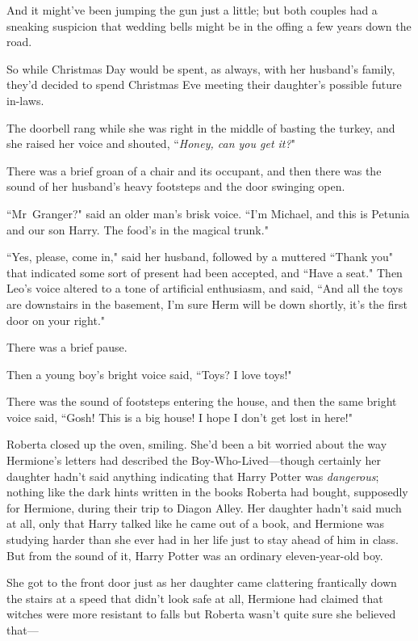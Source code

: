 And it might've been jumping the gun just a little; but both couples had a sneaking suspicion that wedding bells might be in the offing a few years down the road.

So while Christmas Day would be spent, as always, with her husband's family, they'd decided to spend Christmas Eve meeting their daughter's possible future in-laws.

The doorbell rang while she was right in the middle of basting the turkey, and she raised her voice and shouted, ``\emph{Honey, can you get it?}"

There was a brief groan of a chair and its occupant, and then there was the sound of her husband's heavy footsteps and the door swinging open.

``Mr~Granger?" said an older man's brisk voice. ``I'm Michael, and this is Petunia and our son Harry. The food's in the magical trunk."

``Yes, please, come in," said her husband, followed by a muttered ``Thank you" that indicated some sort of present had been accepted, and ``Have a seat." Then Leo's voice altered to a tone of artificial enthusiasm, and said, ``And all the toys are downstairs in the basement, I'm sure Herm will be down shortly, it's the first door on your right."

There was a brief pause.

Then a young boy's bright voice said, ``Toys? I love toys!"

There was the sound of footsteps entering the house, and then the same bright voice said, ``Gosh! This is a big house! I hope I don't get lost in here!"

Roberta closed up the oven, smiling. She'd been a bit worried about the way Hermione's letters had described the Boy-Who-Lived—though certainly her daughter hadn't said anything indicating that Harry Potter was \emph{dangerous}; nothing like the dark hints written in the books Roberta had bought, supposedly for Hermione, during their trip to Diagon Alley. Her daughter hadn't said much at all, only that Harry talked like he came out of a book, and Hermione was studying harder than she ever had in her life just to stay ahead of him in class. But from the sound of it, Harry Potter was an ordinary eleven-year-old boy.

She got to the front door just as her daughter came clattering frantically down the stairs at a speed that didn't look safe at all, Hermione had claimed that witches were more resistant to falls but Roberta wasn't quite sure she believed that—

